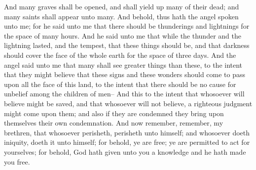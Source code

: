 \bverse \iffalse And many graves shall be opened, and shall yield up many of their dead; and many saints shall appear unto many. \fi
And many graves shall be opened, and shall yield up many of their dead; and many saints shall appear unto many.
\bverse \iffalse And behold, thus hath the angel spoken unto me; for he said unto me that there should be thunderings and lightnings for the space of many hours. \fi
And behold, thus hath the angel spoken unto me; for he said unto me that there should be thunderings and lightnings for the space of many hours.
\bverse \iffalse And he said unto me that while the thunder and the lightning lasted, and the tempest, that these things should be, and that darkness should cover the face of the whole earth for the space of three days. \fi
And he said unto me that while the thunder and the lightning lasted, and the tempest, that these things should be, and that darkness should cover the face of the whole earth for the space of three days.
\bverse \iffalse And the angel said unto me that many shall see greater things than these, to the intent that they might believe that these signs and these wonders should come to pass upon all the face of this land, to the intent that there should be no cause for unbelief among the children of men-- \fi
And the angel said unto me that many shall see greater things than these, to the intent that they might believe that these signs and these wonders should come to pass upon all the face of this land, to the intent that there should be no cause for unbelief among the children of men--
\bverse \iffalse And this to the intent that whosoever will believe might be saved, and that whosoever will not believe, a righteous judgment might come upon them; and also if they are condemned they bring upon themselves their own condemnation. \fi
And this to the intent that whosoever will believe might be saved, and that whosoever will not believe, a righteous judgment might come upon them; and also if they are condemned they bring upon themselves their own condemnation.
\bverse \iffalse And now remember, remember, my brethren, that whosoever perisheth, perisheth unto himself; and whosoever doeth iniquity, doeth it unto himself; for behold, ye are free; ye are permitted to act for yourselves; for behold, God hath given unto you a knowledge and he hath made you free. \fi
And now remember, remember, my brethren, that whosoever perisheth, perisheth unto himself; and whosoever doeth iniquity, doeth it unto himself; for behold, ye are free; ye are permitted to act for yourselves; for behold, God hath given unto you a knowledge and he hath made you free.
